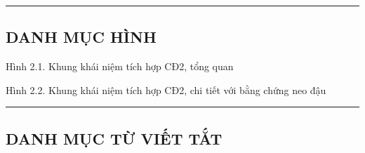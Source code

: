 \documentclass[12pt,a4paper]{article}
\begin{document}
\begin{center}\rule{0.5\linewidth}{0.5pt}\end{center}

\hypertarget{danh-mux1ee5c-huxecnh}{%
\subsection{DANH MỤC HÌNH}\label{danh-mux1ee5c-huxecnh}}

Hình 2.1. Khung khái niệm tích hợp CĐ2, tổng quan

Hình 2.2. Khung khái niệm tích hợp CĐ2, chi tiết với bằng chứng neo đậu

\begin{center}\rule{0.5\linewidth}{0.5pt}\end{center}

\hypertarget{danh-mux1ee5c-tux1eeb-viux1ebft-tux1eaft}{%
\subsection{DANH MỤC TỪ VIẾT
TẮT}\label{danh-mux1ee5c-tux1eeb-viux1ebft-tux1eaft}}
\end{document}
